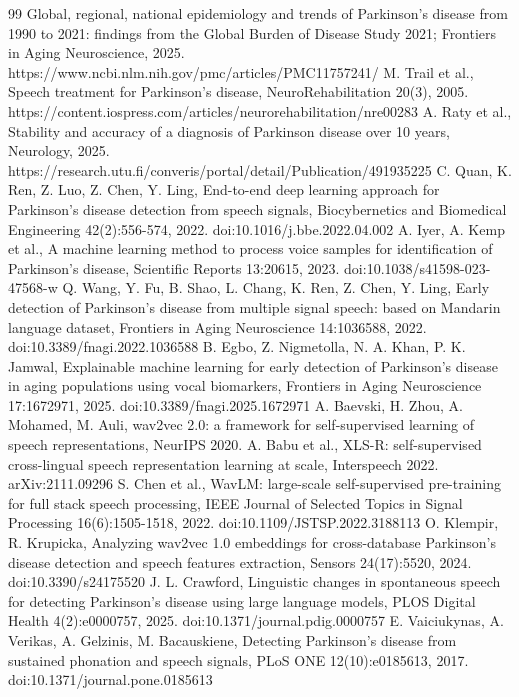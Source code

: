 \documentclass[11pt,a4paper]{article}
\begin{document}
\begin{thebibliography}{99}\setlength{\itemsep}{1pt}\small
{} Global, regional, national epidemiology and trends of Parkinson's disease from 1990 to 2021: findings from the Global Burden of Disease Study 2021; Frontiers in Aging Neuroscience, 2025. https://www.ncbi.nlm.nih.gov/pmc/articles/PMC11757241/
 M. Trail et al., Speech treatment for Parkinson's disease, NeuroRehabilitation 20(3), 2005. https://content.iospress.com/articles/neurorehabilitation/nre00283
 A. Raty et al., Stability and accuracy of a diagnosis of Parkinson disease over 10 years, Neurology, 2025. https://research.utu.fi/converis/portal/detail/Publication/491935225
 C. Quan, K. Ren, Z. Luo, Z. Chen, Y. Ling, End-to-end deep learning approach for Parkinson's disease detection from speech signals, Biocybernetics and Biomedical Engineering 42(2):556-574, 2022. doi:10.1016/j.bbe.2022.04.002
 A. Iyer, A. Kemp et al., A machine learning method to process voice samples for identification of Parkinson's disease, Scientific Reports 13:20615, 2023. doi:10.1038/s41598-023-47568-w
 Q. Wang, Y. Fu, B. Shao, L. Chang, K. Ren, Z. Chen, Y. Ling, Early detection of Parkinson's disease from multiple signal speech: based on Mandarin language dataset, Frontiers in Aging Neuroscience 14:1036588, 2022. doi:10.3389/fnagi.2022.1036588
 B. Egbo, Z. Nigmetolla, N. A. Khan, P. K. Jamwal, Explainable machine learning for early detection of Parkinson's disease in aging populations using vocal biomarkers, Frontiers in Aging Neuroscience 17:1672971, 2025. doi:10.3389/fnagi.2025.1672971
 A. Baevski, H. Zhou, A. Mohamed, M. Auli, wav2vec 2.0: a framework for self-supervised learning of speech representations, NeurIPS 2020.
 A. Babu et al., XLS-R: self-supervised cross-lingual speech representation learning at scale, Interspeech 2022. arXiv:2111.09296
 S. Chen et al., WavLM: large-scale self-supervised pre-training for full stack speech processing, IEEE Journal of Selected Topics in Signal Processing 16(6):1505-1518, 2022. doi:10.1109/JSTSP.2022.3188113
 O. Klempir, R. Krupicka, Analyzing wav2vec 1.0 embeddings for cross-database Parkinson's disease detection and speech features extraction, Sensors 24(17):5520, 2024. doi:10.3390/s24175520
 J. L. Crawford, Linguistic changes in spontaneous speech for detecting Parkinson's disease using large language models, PLOS Digital Health 4(2):e0000757, 2025. doi:10.1371/journal.pdig.0000757
 E. Vaiciukynas, A. Verikas, A. Gelzinis, M. Bacauskiene, Detecting Parkinson's disease from sustained phonation and speech signals, PLoS ONE 12(10):e0185613, 2017. doi:10.1371/journal.pone.0185613

\end{thebibliography}
\end{document}
